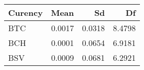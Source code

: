 
\begin{tabular}[t]{lrrr}
\toprule
Curency & Mean & Sd & Df\\
\midrule
BTC & 0.0017 & 0.0318 & 8.4798\\
BCH & 0.0001 & 0.0654 & 6.9181\\
BSV & 0.0009 & 0.0681 & 6.2921\\
\bottomrule
\end{tabular}
